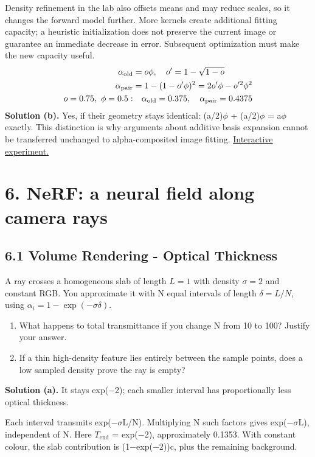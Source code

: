 \documentclass[11pt,a4paper]{article}
\begin{document}
Density refinement in the lab also offsets means and may reduce scales, so it changes the forward model further.
More kernels create additional fitting capacity; a heuristic initialization does not preserve the current image or guarantee an immediate decrease in error.
Subsequent optimization must make the new capacity useful.
\[
\begin{aligned}\alpha_{\rm old}&=o\phi,\quad o^\prime=1-\sqrt{1-o}\\\alpha_{\rm pair}&=1-(1-o^\prime\phi)^2=2o^\prime\phi-o^{\prime2}\phi^2\\o=0.75,\ \phi=0.5:&\quad\alpha_{\rm old}=0.375,\quad\alpha_{\rm pair}=0.4375\end{aligned}
\]
\noindent\textbf{Solution (b).} Yes, if their geometry stays identical: (a/2)$\phi$ + (a/2)$\phi$ = a$\phi$ exactly.
This distinction is why arguments about additive basis expansion cannot be transferred unchanged to alpha-composited image fitting.
\noindent\href{https://sosekie.github.io/Unibe-CVG-CV-Interactive-Labs/tutorial-09/#reconstruction}{Interactive experiment.}
\par{}\section*{6. NeRF: a neural field along camera rays}
\subsection*{6.1 Volume Rendering - Optical Thickness}
A ray crosses a homogeneous slab of length $L=1$ with density $\sigma=2$ and constant RGB.
You approximate it with N equal intervals of length $\delta=L/N$, using $\alpha_i=1-\exp(-\sigma\delta)$.
\begin{enumerate}[label=(\alph*),nosep]
\item What happens to total transmittance if you change N from 10 to 100?
Justify your answer.
\item If a thin high-density feature lies entirely between the sample points, does a low sampled density prove the ray is empty?
\end{enumerate}
\noindent\textbf{Solution (a).} It stays exp($-$2); each smaller interval has proportionally less optical thickness.

Each interval transmits exp($-$$\sigma$L/N).
Multiplying N such factors gives exp($-$$\sigma$L), independent of N.
Here $T_{\mathrm{end}}$ = exp($-$2), approximately 0.1353.
With constant colour, the slab contribution is (1$-$exp($-$2))c, plus the remaining background.
\end{document}
